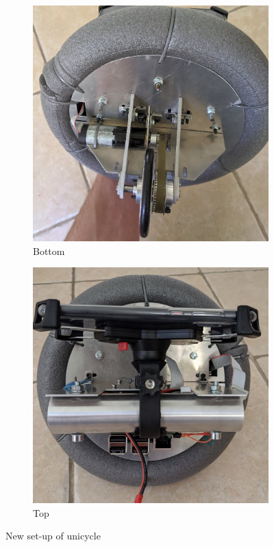 \documentclass[twoside,twocolumn,12pt]{article}
\begin{document}
\begin{figure}[ht!]
  \begin{subfigure}[t]{0.325\textwidth}
    \includegraphics[width=\linewidth]{botnew}
    \caption{Bottom}
  \label{sub:botnew}
  \end{subfigure}
  \begin{subfigure}[t]{0.325\textwidth}
    \includegraphics[width=\linewidth]{topnew}
    \caption{Top}
  \label{sub:topnew}
  \end{subfigure}
  
  \caption{New set-up of unicycle}
  \label{fig:new}
\end{figure}
\end{document}
